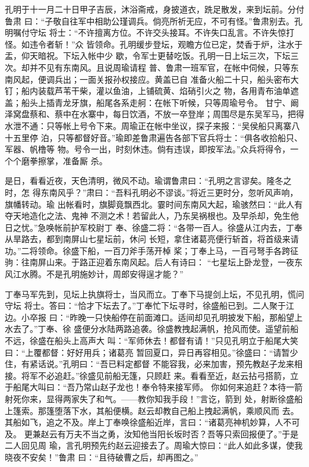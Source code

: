 孔明于十一月二十日甲子吉辰，沐浴斋戒，身披道衣，跣足散发，来到坛前。分付鲁肃
曰：“子敬自往军中相助公瑾调兵。倘亮所祈无应，不可有怪。”鲁肃别去。孔明嘱付守坛
将士：“不许擅离方位。不许交头接耳。不许失口乱言。不许失惊打怪。如违令者斩！”众
皆领命。孔明缓步登坛，观瞻方位已定，焚香于炉，注水于盂，仰天暗祝。下坛入帐中少
歇，令军士更替吃饭。孔明一日上坛三次，下坛三次。却并不见有东南风。且说周瑜请程
普、鲁肃一班军官，在帐中伺候，只等东南风起，便调兵出；一面关报孙权接应。黄盖已自
准备火船二十只，船头密布大钉；船内装载芦苇干柴，灌以鱼油，上铺硫黄、焰硝引火之
物，各用青布油单遮盖；船头上插青龙牙旗，船尾各系走舸：在帐下听候，只等周瑜号令。
甘宁、阚泽窝盘蔡和、蔡中在水寨中，每日饮酒，不放一卒登岸；周围尽是东吴军马，把得
水泄不通：只等帐上号令下来。周瑜正在帐中坐议，探子来报：“吴侯船只离寨八十五里停
泊，只等都督好音。”瑜即差鲁肃遍告各部下官兵将士：“俱各收拾船只、军器、帆橹等
物。号令一出，时刻休违。倘有违误，即按军法。”众兵将得令，一个个磨拳擦掌，准备厮
杀。

是日，看看近夜，天色清明，微风不动。瑜谓鲁肃曰：“孔明之言谬矣。隆冬之时，怎
得东南风乎？”肃曰：“吾料孔明必不谬谈。”将近三更时分，忽听风声响，旗幡转动。瑜
出帐看时，旗脚竟飘西北。霎时间东南风大起，瑜骇然曰：“此人有夺天地造化之法、鬼神
不测之术！若留此人，乃东吴祸根也。及早杀却，免生他日之忧。”急唤帐前护军校尉丁
奉、徐盛二将：“各带一百人。徐盛从江内去，丁奉从旱路去，都到南屏山七星坛前，休问
长短，拿住诸葛亮便行斩首，将首级来请功。”二将领命。徐盛下船，一百刀斧手荡开棹
桨；丁奉上马，一百弓弩手各跨征驹：往南屏山来。于路正迎着东南风起。后人有诗曰：
“七星坛上卧龙登，一夜东风江水腾。不是孔明施妙计，周郎安得逞才能？”

丁奉马军先到，见坛上执旗将士，当风而立。丁奉下马提剑上坛，不见孔明，慌问守坛
将士。答曰：“恰才下坛去了。”丁奉忙下坛寻时，徐盛船已到。二人聚于江边。小卒报
曰：“昨晚一只快船停在前面滩口。适间却见孔明披发下船，那船望上水去了。”丁奉、徐
盛便分水陆两路追袭。徐盛教拽起满帆，抢风而使。遥望前船不远，徐盛在船头上高声大
叫：“军师休去！都督有请！”只见孔明立于船尾大笑曰：“上覆都督：好好用兵；诸葛亮
暂回夏口，异日再容相见。”徐盛曰：“请暂少住，有紧话说。”孔明曰：“吾已料定都督
不能容我，必来加害，预先教赵子龙来相接。将军不必追赶。”徐盛见前船无篷，只顾赶
来。看看至近，赵云拈弓搭箭，立于船尾大叫曰：“吾乃常山赵子龙也！奉令特来接军师。
你如何来追赶？本待一箭射死你来，显得两家失了和气。——教你知我手段！”言讫，箭到
处，射断徐盛船上篷索。那篷堕落下水，其船便横。赵云却教自己船上拽起满帆，乘顺风而
去。其船如飞，追之不及。岸上丁奉唤徐盛船近岸，言曰：“诸葛亮神机妙算，人不可及。
更兼赵云有万夫不当之勇，汝知他当阳长坂时否？吾等只索回报便了。”于是二人回见周
瑜，言孔明预先约赵云迎接去了。周瑜大惊曰：“此人如此多谋，使我晓夜不安矣！”鲁肃
曰：“且待破曹之后，却再图之。”

